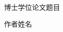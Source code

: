 \documentclass[a4paper,fontset=windows]{ctexart}
\newcommand{\spinetitle}{博士学位论文题目}
\newcommand{\spineauthor}{作者姓名}
\begin{document}
\thispagestyle{empty}
\noindent
\begin{minipage}[t][247mm][s]{14bp}
  \fangsong\fontsize{14bp}{20bp}\selectfont\centering
  \spinetitle\par
  \vfill
  \spineauthor\par
\end{minipage}
\end{document}
